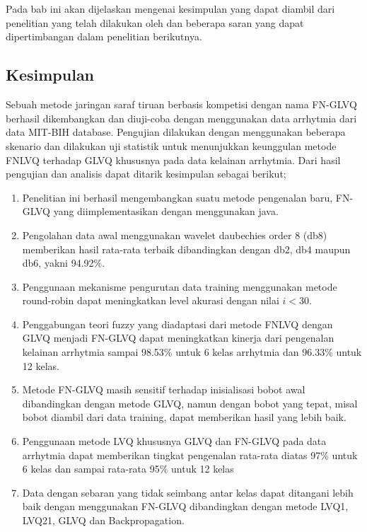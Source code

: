 \chapter{\kesimpulan}
Pada bab ini akan dijelaskan mengenai kesimpulan yang dapat diambil dari
penelitian yang telah dilakukan oleh \saya dan beberapa saran yang dapat
dipertimbangan dalam penelitian berikutnya.

\section{Kesimpulan}
Sebuah metode jaringan saraf tiruan berbasis kompetisi dengan nama
FN-GLVQ berhasil dikembangkan dan diuji-coba dengan menggunakan data arrhytmia
dari data MIT-BIH database. Pengujian dilakukan dengan menggunakan beberapa
skenario dan dilakukan uji statistik untuk menunjukkan keunggulan metode FNLVQ
terhadap GLVQ khususnya pada data kelainan arrhytmia. Dari hasil pengujian dan
analisis dapat ditarik kesimpulan sebagai berikut;
\begin{enumerate}
  \item Penelitian ini berhasil mengembangkan suatu metode pengenalan baru,
  FN-GLVQ yang diimplementasikan dengan menggunakan java.
  \item Pengolahan data awal menggunakan wavelet daubechies order 8 (db8)
  memberikan hasil rata-rata terbaik dibandingkan dengan db2, db4 maupun
  db6, yakni 94.92\%. 


  \item Penggunaan mekanisme pengurutan data training menggunakan metode
  round-robin dapat meningkatkan level akurasi dengan nilai $i < 30$.
  \item Penggabungan teori fuzzy yang diadaptasi dari metode FNLVQ dengan
  GLVQ menjadi FN-GLVQ dapat meningkatkan kinerja dari pengenalan kelainan
  arrhytmia sampai 98.53\% untuk 6 kelas arrhytmia dan 96.33\% untuk 12 kelas.
  \item Metode FN-GLVQ masih sensitif terhadap inisialisasi bobot awal
  dibandingkan dengan metode GLVQ, namun dengan bobot yang tepat, misal bobot
  diambil dari data training, dapat memberikan hasil yang lebih baik.
  \item Penggunaan metode LVQ khususnya GLVQ dan FN-GLVQ pada data arrhytmia
  dapat memberikan tingkat pengenalan rata-rata diatas 97\% untuk 6 kelas dan
  sampai rata-rata 95\% untuk 12 kelas
  \item Data dengan sebaran yang tidak seimbang antar kelas dapat ditangani
  lebih baik dengan menggunakan FN-GLVQ dibandingkan dengan metode LVQ1, LVQ21,
  GLVQ dan Backpropagation.
\end{enumerate}

